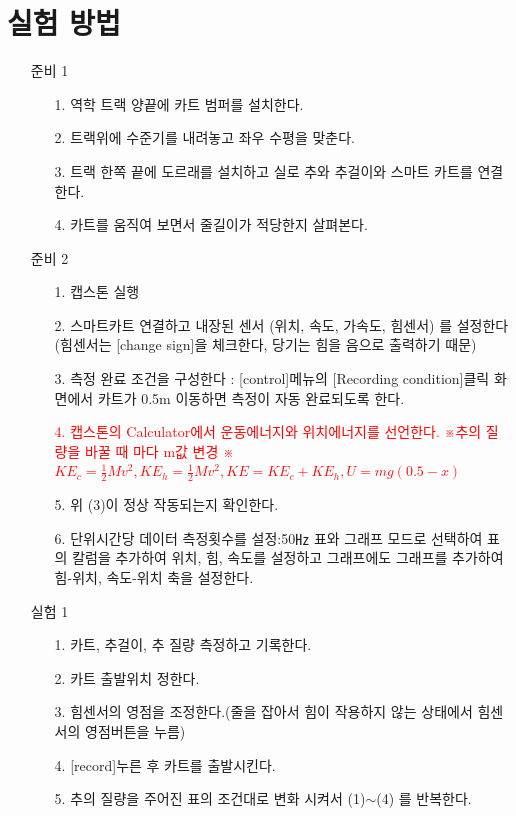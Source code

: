 \documentclass[12pt,a4paper]{article}
\begin{document}
\section{실험 방법}
\begin{enumerate}
    \item [준비 1]
        \begin{enumerate}
            \item [1.] 역학 트랙 양끝에 카트 범퍼를 설치한다.
            \item [2.] 트랙위에 수준기를 내려놓고 좌우 수평을 맞춘다.
            \item [3.] 트랙 한쪽 끝에 도르래를 설치하고 실로 추와 추걸이와
                스마트 카트를 연결한다.
            \item [4.] 카트를 움직여 보면서 줄길이가 적당한지 살펴본다.
        \end{enumerate}
    \item [준비 2]
        \begin{enumerate}
            \item [1.] 캡스톤 실행
            \item [2.] 스마트카트 연결하고 내장된 센서 (위치, 속도, 가속도, 힘센서)
                를 설정한다(힘센서는 [change sign]을 체크한다, 당기는 힘을 음으로
                출력하기 때문)
            \item [3.] 측정 완료 조건을 구성한다 : [control]메뉴의
                [Recording condition]클릭 화면에서 카트가 0.5m 이동하면 측정이
                자동 완료되도록 한다.
            \item [\textcolor{red}{4.}] \textcolor{red}{캡스톤의 Calculator에서
                운동에너지와 위치에너지를 선언한다. ※추의 질량을 바꿀 때 마다
                m값 변경 ※$K\!E_c=\frac{1}{2}Mv^2, K\!E_h=\frac{1}{2}Mv^2, 
                K\!E=K\!E_c+K\!E_h, U=mg(0.5-x)$}
            \item [5.] 위 (3)이 정상 작동되는지 확인한다.
            \item [6.] 단위시간당 데이터 측정횟수를 설정:50㎐
                표와 그래프 모드로 선택하여 표의 칼럼을 추가하여 위치, 힘, 속도를
                설정하고 그래프에도 그래프를 추가하여 힘-위치, 속도-위치 축을
                설정한다.
        \end{enumerate}
    \item [실험 1]
        \begin{enumerate}
            \item [1.] 카트, 추걸이, 추 질량 측정하고 기록한다.
            \item [2.] 카트 출발위치 정한다.
            \item [3.] 힘센서의 영점을 조정한다.(줄을 잡아서 힘이 작용하지 않는
                상태에서 힘센서의 영점버튼을 누름)
            \item [4.] {[record]누른 후 카트를 출발시킨다.}
            \item [5.] 추의 질량을 주어진 표의 조건대로 변화 시켜서 (1)$\sim$(4) 를
                반복한다.
        \end{enumerate}
\end{enumerate}
\end{document}
